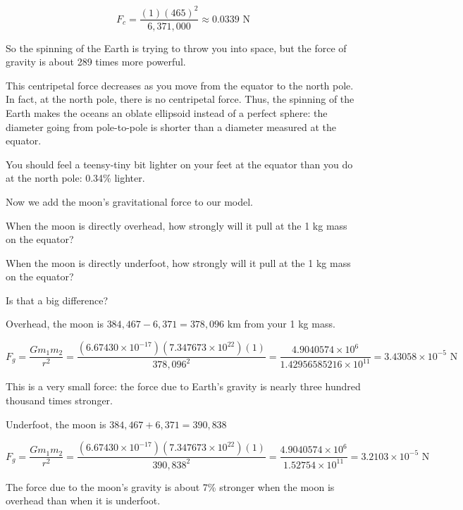\begin{Answer}[ref=life-orbits2]

$$F_c = \frac{(1) (465)^2}{6,371,000} \approx 0.0339 \text{ N}$$

So the spinning of the Earth is trying to throw you into space,  but the force of gravity is about 289 times more powerful.

This centripetal force decreases as you move from the equator to the north pole.   In fact, at the north pole, 
there is no centripetal force.   Thus, the spinning of the Earth makes the oceans an oblate ellipsoid instead of a perfect sphere: the diameter going from pole-to-pole is shorter than a diameter measured at the equator.

You should feel a teensy-tiny bit lighter on your feet at the equator than you do at the north pole: 0.34\% lighter.

\end{Answer}

\begin{Exercise}[title={Life Among the Orbits 3: The Moon's Gravity}, label=life-orbits3]

Now we add the moon's gravitational force to our model.

When the moon is directly overhead,   how strongly will it pull at the 1 kg mass on the equator?

When the moon is directly underfoot,  how strongly will it pull at the 1 kg mass on the equator?

Is that a big difference?

\end{Exercise}

\begin{Answer}[ref=life-orbits3]

Overhead, the moon is $384,467 - 6,371 = 378,096$ km from your 1 kg mass.

$$F_g =  \frac{G m_1 m_2}{r^2} = \frac{\left( 6.67430 \times 10^{-17} \right) \left( 7.347673 \times 10^{22} \right) \left(1\right)}{378,096^2} =  
\frac{4.9040574 \times 10^{6}}{1.42956585216 \times 10^{11}}  = 3.43058 \times 10^{-5} \text{ N}$$

This is a very small force: the force due to Earth's gravity is nearly three hundred thousand times stronger.

Underfoot, the moon is $384,467 + 6,371 = 390,838$

$$F_g =  \frac{G m_1 m_2}{r^2} = \frac{\left( 6.67430 \times 10^{-17} \right) \left( 7.347673 \times 10^{22} \right) \left(1\right)}{390,838^2} =  \frac{4.9040574 \times 10^{6}}{1.52754 \times 10^{11}} =  3.2103 \times 10^{-5} \text{ N}$$

The force due to the moon's gravity is about 7\% stronger when the moon is overhead than when it is underfoot. 

\end{Answer}

